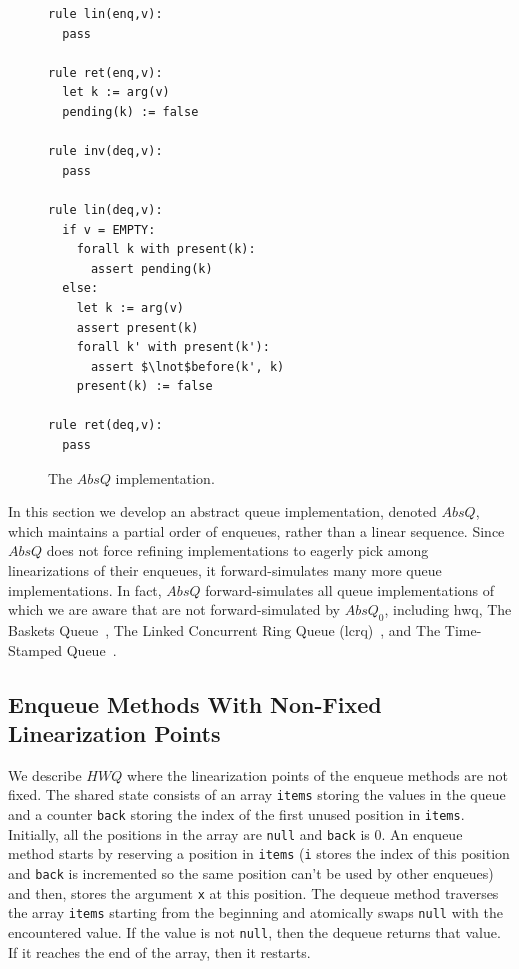 \begin{figure}[t]
\begin{minipage}[b]{0.4\linewidth}
\begin{lstlisting}
rule lin(enq,v):
  pass

rule ret(enq,v):
  let k := arg(v)
  pending(k) := false

rule inv(deq,v):
  pass

rule lin(deq,v):
  if v = EMPTY:
    forall k with present(k):
      assert pending(k)
  else:
    let k := arg(v)
    assert present(k)
    forall k' with present(k'):
      assert $\lnot$before(k', k)
    present(k) := false

rule ret(deq,v):
  pass
    \end{lstlisting}
    \caption{The $AbsQ$ implementation.}
    \label{fig:transitions:AbsQ}
  \end{minipage}
\end{figure}

In this section we develop an abstract queue implementation, denoted $AbsQ$,
which maintains a partial order of enqueues, rather than a linear sequence.
Since $AbsQ$ does not force refining implementations to eagerly pick among
linearizations of their enqueues, it forward-simulates many more queue
implementations. In fact, $AbsQ$ forward-simulates all queue implementations of
which we are aware that are not forward-simulated by $AbsQ_0$, including {\sc
hwq}, The Baskets Queue~\cite{DBLP:conf/opodis/HoffmanSS07}, The Linked
Concurrent Ring Queue ({\sc lcrq})~\cite{DBLP:conf/ppopp/MorrisonA13}, and The
Time-Stamped Queue~\cite{DBLP:conf/popl/DoddsHK15}.


\vspace{-3.5mm}
\subsection{Enqueue Methods With Non-Fixed Linearization Points}
\vspace{-1mm}
We describe $\mathit{HWQ}$ where the linearization points of the enqueue methods are not fixed.
The shared state consists of an array {\tt items} storing the values in the queue and a counter {\tt back} storing the index of the first unused position in {\tt items}. Initially, all the positions in the array are {\tt null} and {\tt back} is 0.
An enqueue method starts by reserving a position in {\tt items} ({\tt i} stores the index of this position and {\tt back} is incremented so the same position can't be used by other enqueues) and then, stores the argument {\tt x} at this position. The dequeue method traverses the array {\tt items} starting from the beginning and atomically swaps {\tt null} with the encountered value. If the value is not {\tt null}, then the dequeue returns that value. If it reaches the end of the array, then it restarts.

